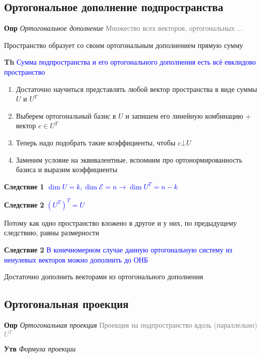 \documentclass[a4paper, 14pt]{article}
\begin{document}
    \subsection{Ортогональное дополнение подпространства}
    
    \textbf{Опр} \textit{Ортогональное дополнение} \textcolor{gray}{Множество всех векторов, ортогональных ...}
    
    Пространство образует со своим ортогональным дополнением прямую сумму
    
    \textbf{Th} \textcolor{blue}{Сумма подпространства и его ортогонального дополнения есть всё евклидово пространство}
    
    \begin{enumerate}
        \item Достаточно научиться представлять любой вектор пространства в виде суммы $U$ и $U^T$
        \item Выберем ортогональный базис в $U$ и запишем его линейную комбинацию + вектор $c \in  U^T$
        \item Теперь надо подобрать такие коэффициенты, чтобы $c \bot U$
        \item Заменим условие на эквивалентные, вспомним про ортонормированность базиса и выразим коэффициенты
    \end{enumerate}
    
    \textbf{Следствие 1} \textcolor{blue}{$\dim U = k, \dim \mathscr{E} = n \rightarrow \dim U^T = n - k$}
    
    \textbf{Следствие 2} \textcolor{blue}{$(U^T)^T = U$}
    
    Потому как одно пространство вложено в другое и у них, по предыдущему следствию, равны размерности
    
    \textbf{Следствие 2} \textcolor{blue}{В конечномерном случае данную ортогональную систему из ненулевых векторов
    можно дополнить до ОНБ}
    
    Достаточно дополнить векторами из ортогонального дополнения
    
    \subsection{Ортогональная проекция}
    
    \textbf{Опр} \textit{Ортогональная проекция} \textcolor{gray}{Проекция на подпространство вдоль (параллельно) $U^T$}
    
    \textbf{Утв} \textit{Формула проекции}
    
\end{document}
